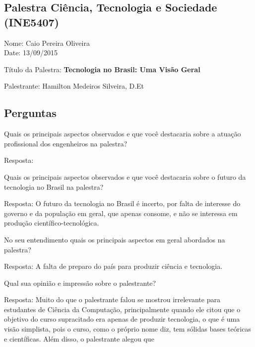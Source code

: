 \documentclass{article}
\begin{document}
\begin{center}
\section*{Palestra Ciência, Tecnologia e Sociedade (INE5407)}
\begin{center}
Nome: Caio Pereira Oliveira
\\Date: 13/09/2015
\end{center}
Título da Palestra: {\bf Tecnologia no Brasil: Uma Visão Geral}

Palestrante: Hamilton Medeiros Silveira, D.Et

\subsection*{Perguntas}

\end{center}

\begin{enumerate} %

{\bf \item Quais os principais aspectos observados e que você destacaria sobre a atuação profissional dos engenheiros na palestra?}

Resposta: 

{\bf \item Quais os principais aspectos observados e que você destacaria sobre o futuro da tecnologia no Brasil na palestra?}

Resposta: O futuro da tecnologia no Brasil é incerto, por falta de interesse do governo e da população em geral, que apenas consome, e não se interessa em produção científico-tecnológica.

{\bf \item No seu entendimento quais os principais aspectos em geral abordados na palestra?}

Resposta: A falta de preparo do país para produzir ciência e tecnologia.

{\bf \item Qual sua opinião e impressão sobre o palestrante?}

Resposta: Muito do que o palestrante falou se mostrou irrelevante para estudantes de Ciência da Computação, principalmente quando ele citou que o objetivo do curso supracitado era apenas de produzir tecnologia, o que é uma visão simplista, pois o curso, como o próprio nome diz, tem sólidas bases teóricas e científicas. Além disso, o palestrante alegou que 

\end{enumerate}
\end{document}
